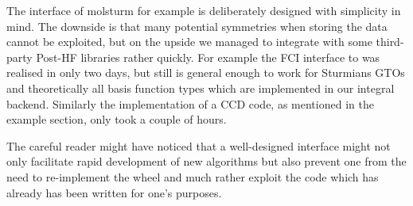 



%
%
The \python interface of molsturm for example is deliberately designed
with simplicity in mind.
The downside is that many potential symmetries when storing the data
cannot be exploited,
but on the upside we managed to integrate \molsturm
with some third-party Post-HF libraries rather quickly.
For example the FCI interface to \pyscf was realised in only two days,
but still is general enough to work for Sturmians GTOs and theoretically
all basis function types which are implemented in our integral backend.
Similarly the implementation of a CCD code, as mentioned in the example section,
only took a couple of hours.

The careful reader might have noticed that a well-designed interface
might not only facilitate rapid development of new algorithms
but also prevent one from the need to re-implement the wheel
and much rather exploit the code which has already has been written
for one's purposes.

